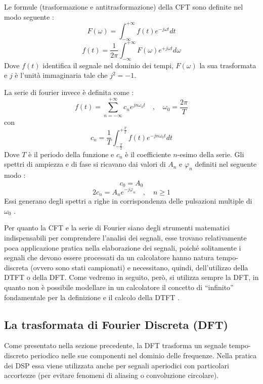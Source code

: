 Le formule (trasformazione e antitrasformazione) della CFT sono definite nel modo seguente \cite[p.~2.7]{calandrino}:
\begin{equation}
    {F}(\omega) = \int_{-\infty}^{+\infty} f(t){e}^{-j \omega t} dt
\end{equation}
\begin{equation}
    {f}(t) = \frac{1}{2\pi}\int_{-\infty}^{+\infty} F(\omega){e}^{+j \omega t} d\omega
\end{equation}
Dove $f(t)$ identifica il segnale nel dominio dei tempi, $F(\omega)$ la sua trasformata e $j$ è l'unità immaginaria tale che $j^2 = -1$.

La serie di fourier invece è definita come \cite[p.~2.4]{calandrino}:
\begin{equation}
    {f}(t) = \displaystyle\sum_{n=-\infty}^{+\infty} c_n e^{jn \omega_0 t} \quad, \quad \omega_0 = \frac{2\pi}{T}
\end{equation}
con
\begin{equation}
    c_n = \frac{1}{T}\int_{-\frac{T}{2}}^{+\frac{T}{2}}f(t)e^{-jn \omega_0 t} dt
\end{equation}
Dove $T$ è il periodo della funzione e $c_n$ è il coefficiente $n$-esimo della serie. Gli spettri di ampiezza e di fase si ricavano dai valori di $A_n$ e $\varphi_n$ definiti nel seguente modo \cite[p.~2.5]{calandrino}:
\begin{equation}
    c_0 = A_0
\end{equation}
\begin{equation}
    2 c_n = A_n e^{-j\varphi_n} \quad,\quad n \geq 1
\end{equation}
Essi generano degli spettri a righe in corrispondenza delle pulsazioni multiple di $\omega_0$ \cite[p.~2.5]{calandrino}.

Per quanto la CFT e la serie di Fourier siano degli strumenti matematici indispensabili per comprendere l'analisi dei segnali, esse trovano relativamente poca applicazione pratica nella elaborazione dei segnali, poiché solitamente i segnali che devono essere processati da un calcolatore hanno natura tempo-discreta (ovvero sono stati campionati) e necessitano, quindi, dell'utilizzo della DTFT o della DFT. Come vedremo in seguito, però, si utilizza sempre la DFT, in quanto non è possibile modellare in un calcolatore il concetto di ``infinito'' fondamentale per la definizione e il calcolo della DTFT \cite[pp.~144-145]{dspguide}.

\subsection{La trasformata di Fourier Discreta (DFT)}
Come presentato nella sezione precedente, la DFT trasforma un segnale tempo-discreto periodico nelle sue componenti nel dominio delle frequenze. Nella pratica dei DSP essa viene utilizzata anche per segnali aperiodici con particolari accortezze (per evitare fenomeni di aliasing o convoluzione circolare).

